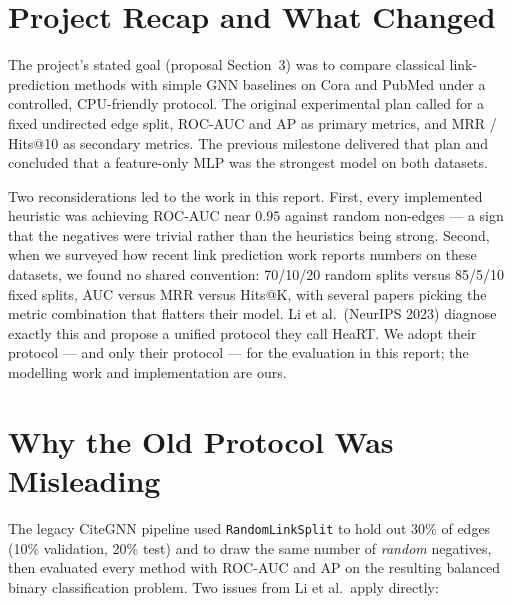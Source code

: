 \documentclass[10pt,a4paper]{article}
\begin{document}
\section{Project Recap and What Changed}
\label{sec:recap}

The project's stated goal (proposal Section~3) was to compare classical
link-prediction methods with simple GNN baselines on Cora and PubMed
under a controlled, CPU-friendly protocol. The original experimental
plan called for a fixed undirected edge split, ROC-AUC and AP as
primary metrics, and MRR / Hits@10 as secondary metrics. The previous
milestone delivered that plan and concluded that a feature-only MLP was
the strongest model on both datasets.

Two reconsiderations led to the work in this report. First, every
implemented heuristic was achieving ROC-AUC near $0.95$ against random
non-edges --- a sign that the negatives were trivial rather than the
heuristics being strong. Second, when we surveyed how recent link
prediction work reports numbers on these datasets, we found no shared
convention: 70/10/20 random splits versus 85/5/10 fixed splits, AUC
versus MRR versus Hits@K, with several papers picking the metric
combination that flatters their model. Li et al.\ (NeurIPS 2023)
diagnose exactly this and propose a unified protocol they call HeaRT.
We adopt their protocol --- and only their protocol --- for the
evaluation in this report; the modelling work and implementation are
ours.

\section{Why the Old Protocol Was Misleading}
\label{sec:motivation}

The legacy CiteGNN pipeline used \texttt{RandomLinkSplit}
to hold out 30\% of edges (10\% validation, 20\% test) and to draw the
same number of \emph{random} negatives, then evaluated every method
with ROC-AUC and AP on the resulting balanced binary classification
problem. Two issues from Li et al.\ apply directly:
\end{document}
